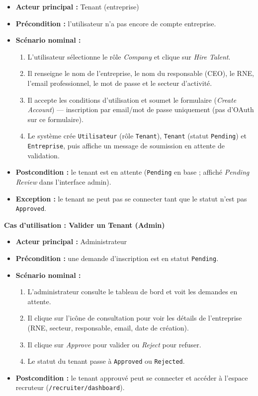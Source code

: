 \begin{itemize}
    \item \textbf{Acteur principal :} Tenant (entreprise)
    \item \textbf{Précondition :} l'utilisateur n'a pas encore de compte entreprise.
    \item \textbf{Scénario nominal :}
    \begin{enumerate}
        \item L'utilisateur sélectionne le rôle \textit{Company} et clique sur
        \textit{Hire Talent}.
        \item Il renseigne le nom de l'entreprise, le nom du responsable (CEO), le RNE,
        l'email professionnel, le mot de passe et le secteur d'activité.
        \item Il accepte les conditions d'utilisation et soumet le formulaire
        (\textit{Create Account}) — inscription par email/mot de passe uniquement
        (pas d'OAuth sur ce formulaire).
        \item Le système crée \texttt{Utilisateur} (rôle \texttt{Tenant}),
        \texttt{Tenant} (statut \texttt{Pending}) et \texttt{Entreprise}, puis affiche
        un message de soumission en attente de validation.
    \end{enumerate}
    \item \textbf{Postcondition :} le tenant est en attente (\texttt{Pending} en base ;
    affiché \textit{Pending Review} dans l'interface admin).
    \item \textbf{Exception :} le tenant ne peut pas se connecter tant que le statut
    n'est pas \texttt{Approved}.
\end{itemize}

\textbf{Cas d'utilisation : Valider un Tenant (Admin)}

\begin{itemize}
    \item \textbf{Acteur principal :} Administrateur
    \item \textbf{Précondition :} une demande d'inscription est en statut \texttt{Pending}.
    \item \textbf{Scénario nominal :}
    \begin{enumerate}
        \item L'administrateur consulte le tableau de bord et voit les demandes en attente.
        \item Il clique sur l'icône de consultation pour voir les détails de l'entreprise
        (RNE, secteur, responsable, email, date de création).
        \item Il clique sur \textit{Approve} pour valider ou \textit{Reject} pour refuser.
        \item Le statut du tenant passe à \texttt{Approved} ou \texttt{Rejected}.
    \end{enumerate}
    \item \textbf{Postcondition :} le tenant approuvé peut se connecter et accéder à
    l'espace recruteur (\texttt{/recruiter/dashboard}).
\end{itemize}

